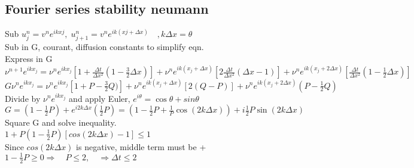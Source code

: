 \documentclass[8pt]{extarticle} %
\begin{document}
\begin{multicols*}{3}
  \subsection{Fourier series stability neumann}
  Sub $u_j^n = v^ne^{ikxj},\;u_{j+1}^n=v^ne^{ik(xj+\Delta x)}\quad,k\Delta x=\theta$\\
  Sub in G, courant, diffusion constants to simplify eqn.\\
  Express in G\\
  \vspace{1ex}
  \begin{math}
  \nu^{n+1}e^{ikx_j}=\nu^ne^{ikx_j}\left[1+\frac{\Delta t}{\Delta x^2}(1-\frac{3}{2}\Delta x)\right]+
  \nu^ne^{ik(x_j+\Delta x)}\left[2\frac{\Delta t}{\Delta x^2}(\Delta x-1)\right]+
  \nu^ne^{ik(x_j+2\Delta x)}\left[\frac{\Delta t}{\Delta x^2}(1-\frac{1}{2}\Delta x)\right]
  \end{math}\\
  \begin{math}
  G\nu^ne^{ikx_j}=\nu^ne^{ikx_j}\left[1+P-\frac{3}{2}Q)\right]+
  \nu^ne^{ik(x_j+\Delta x)}\left[2(Q-P)\right]+
  \nu^ne^{ik(x_j+2\Delta x)}(P-\frac{1}{2}Q)
  \end{math}\\
  Divide by $\nu^ne^{ikx_j}$ and apply Euler, $e^{i\theta}=\cos\theta+sin\theta$\\
  \vspace{1ex}
  \begin{math}
  G=(1-\frac{1}{2}P)+e^{i2k\Delta x}(\frac{1}{2}P)=(1-\frac{1}{2}P+\frac{1}{P}\cos(2k\Delta x))+i\frac{1}{2}P\sin(2k\Delta x)
  \end{math}\\
  Square G and solve inequality.\\
  $1+P(1-\frac{1}{2}P)\left[cos(2k\Delta x)-1\right]\leq1$\\
  Since $cos(2k\Delta x)$ is negative, middle term must be +\\
  $1-\frac{1}{2}P\geq0\Rightarrow\quad P\leq2,\quad\Rightarrow\Delta t\leq 2$

\end{multicols*}
\end{document}

